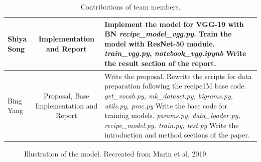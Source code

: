 \documentclass[10pt,twocolumn,letterpaper]{article}
\begin{document}
\begin{table}
\begin{center}
\begin{tabular}{|l|c|p{8cm}|}
Shiya Song & Implementation and Report & 
Implement the model for VGG-19 with BN \newline
\emph{recipe\_model\_vgg.py}. \newline\newline
Train the model with ResNet-50 module. \newline
\emph{train\_vgg.py}, \emph{notebook\_vgg.ipynb} \newline\newline
Write the result section of the report. \newline \\
\hline

Bing Yang & Proposal, Base Implementation and Report & 
Write the proposal. \newline\newline
Rewrite the scripts for data preparation following the recipe1M base code. \newline
\emph{get\_vocab.py, mk\_dataset.py, bigrams.py, utils.py, proc.py} \newline\newline
Write the base code for training models. \newline
\emph{params.py, data\_loader.py, recipe\_model.py, train.py, test.py} \newline\newline
Write the introduction and method sections of the paper. \newline \\
\hline
\end{tabular}
\end{center}
\caption{Contributions of team members.}
\label{tab:contributions}
\end{table}






\begin{figure}[t]
\begin{center}
\end{center}
   \caption{Illustration of the model. Recreated from Marin et al, 2019}
\label{fig:f1}
\end{figure}
\end{document}
